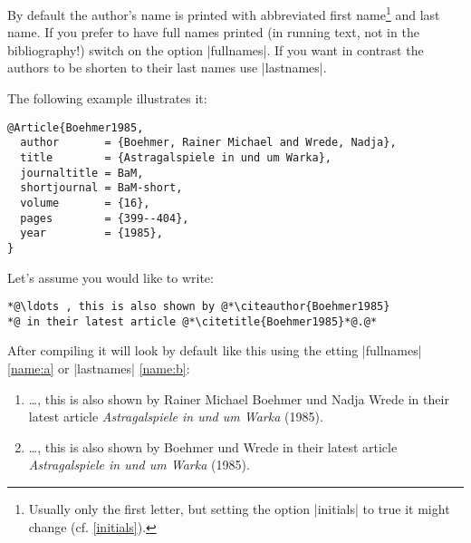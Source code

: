\documentclass[a4paper,
10pt,
greek,
french,
spanish,
italian,
ngerman,
english
]{ltxdoc}
\begin{document}
By default the author's name is printed with abbreviated first name\footnote{Usually only the first letter, but setting the option |initials| to true it might change (cf. \cref{initials}).} and last name.
If you prefer to have full names printed (in running text, not in the bibliography!) switch on the option |fullnames|.
If you want in contrast the authors to be shorten to their last names use |lastnames|.

The following example illustrates it:

\begin{lstlisting}[style=bibentry,label=Boehmer1985,caption={{@}Article\{Boehmer1985,…\} }]
@Article{Boehmer1985,
  author       = {Boehmer, Rainer Michael and Wrede, Nadja},
  title        = {Astragalspiele in und um Warka},
  journaltitle = BaM,
  shortjournal = BaM-short,
  volume       = {16},
  pages        = {399--404},
  year         = {1985},
}
\end{lstlisting}

Let's assume you would like to write:

\begin{refsection}
\begin{lstlisting}
*@\ldots , this is also shown by @*\citeauthor{Boehmer1985} 
*@ in their latest article @*\citetitle{Boehmer1985}*@.@* \end{lstlisting}

After compiling it will look by default like this using the 
etting |fullnames| \ref{name:a} or |lastnames| \ref{name:b}:

\begin{bsp}
\begin{enumerate}
\item\label{name:a} 
\ldots , this is also shown by {\color{red}Rainer Michael Boehmer  und Nadja Wrede} in their latest article \emph{Astragalspiele in und um Warka} (1985).
\item\label{name:b}
\ldots , this is also shown by {\color{red}Boehmer und  Wrede} in their latest article \emph{Astragalspiele in und um Warka} (1985).
\end{enumerate}
\end{bsp}
\end{refsection}

\end{document}
